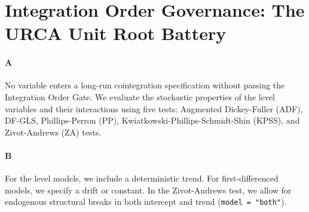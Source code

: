 \documentclass[11pt,a4paper]{article}
\begin{document}
\FloatBarrier
\section{Integration Order Governance: The URCA Unit Root Battery}

\paragraph{A}
No variable enters a long-run cointegration specification without passing the Integration Order Gate. We evaluate the stochastic properties of the level variables and their interactions using five tests: Augmented Dickey-Fuller (ADF), DF-GLS, Phillips-Perron (PP), Kwiatkowski-Phillips-Schmidt-Shin (KPSS), and Zivot-Andrews (ZA) tests.

\paragraph{B}
For the level models, we include a deterministic trend. For first-differenced models, we specify a drift or constant. In the Zivot-Andrews test, we allow for endogenous structural breaks in both intercept and trend (\texttt{model = "both"}). 
\end{document}
